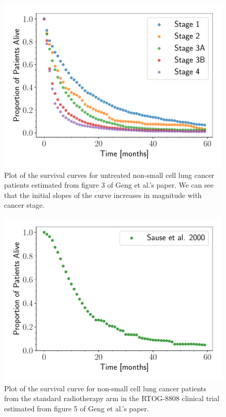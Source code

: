 \documentclass[letterpaper
, superscriptaddress
, twocolumn
, aps
]{revtex4}
\begin{document}
\begin{figure}[h]
	\includegraphics[width=1.00\columnwidth]{Figures/untreated_data.pdf}
	\caption{Plot of the survival curves for untreated non-small cell lung cancer patients estimated from figure 3 of Geng et al.'s paper. We can see that the initial slopes of the curve increases in magnitude with cancer stage.}
	\label{untreated}
\end{figure}

\begin{figure}[h]
	\includegraphics[width=1.00\columnwidth]{Figures/rad_data.pdf}
	\caption{Plot of the survival curve for non-small cell lung cancer patients from the standard radiotherapy arm in the RTOG-8808 clinical trial estimated from figure 5 of Geng et al.'s paper.}
	\label{rad} 
\end{figure}
\end{document}
